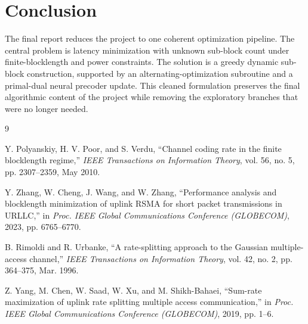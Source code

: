 \documentclass[11pt]{article}
\begin{document}
\clearpage
\section{Conclusion}
The final report reduces the project to one coherent optimization pipeline. The central problem is latency minimization with unknown sub-block count under finite-blocklength and power constraints. The solution is a greedy dynamic sub-block construction, supported by an alternating-optimization subroutine and a primal-dual neural precoder update. This cleaned formulation preserves the final algorithmic content of the project while removing the exploratory branches that were no longer needed.

\begin{thebibliography}{9}

Y. Polyanskiy, H. V. Poor, and S. Verdu, ``Channel coding rate in the finite blocklength regime,'' \emph{IEEE Transactions on Information Theory}, vol. 56, no. 5, pp. 2307--2359, May 2010.

Y. Zhang, W. Cheng, J. Wang, and W. Zhang, ``Performance analysis and blocklength minimization of uplink RSMA for short packet transmissions in URLLC,'' in \emph{Proc. IEEE Global Communications Conference (GLOBECOM)}, 2023, pp. 6765--6770.

B. Rimoldi and R. Urbanke, ``A rate-splitting approach to the Gaussian multiple-access channel,'' \emph{IEEE Transactions on Information Theory}, vol. 42, no. 2, pp. 364--375, Mar. 1996.

Z. Yang, M. Chen, W. Saad, W. Xu, and M. Shikh-Bahaei, ``Sum-rate maximization of uplink rate splitting multiple access communication,'' in \emph{Proc. IEEE Global Communications Conference (GLOBECOM)}, 2019, pp. 1--6.

\end{thebibliography}
\end{document}
